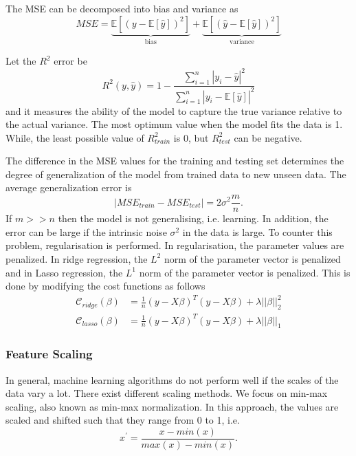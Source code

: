 The MSE can be decomposed into bias and variance as 
\begin{equation}
    MSE = \underbrace{\mathbb{E}[(y - \mathbb{E}[\hat{y}])^2]}_{\text{bias}} + \underbrace{\mathbb{E}[(\hat{y} - \mathbb{E}[\hat{y}])^2]}_{\text{variance}}
\end{equation}

Let the $R^2$ error be 
\begin{equation}
    R^2(y, \hat{y}) = 1 - \frac{\sum_{i=1}^{n}|y_i-\hat{y}|^2}{\sum_{i=1}^{n}|y_i-\mathbb{E}[\hat{y}]|^2}
\end{equation} and it measures the ability of the model to capture the true variance relative to the actual variance. The most optimum value when the model fits the data is 1. While, the least possible value of $R^2_{train}$ is 0, but $R^2_{test}$ can be negative.  

The difference in the MSE values  for the training and testing set determines the degree of generalization of the model from trained data to new unseen data. The average generalization error is \cite{mehta2019high}
\begin{equation*}
    |MSE_{train} - MSE_{test}| = 2\sigma^2\frac{m}{n}.
\end{equation*}
If $m >> n$ then the model is not generalising, i.e. learning. In addition, the error can be large if the intrinsic noise $\sigma^2$ in the data is large. To counter this problem, regularisation is performed. In regularisation, the parameter values are penalized. In ridge regression, the $L^2$ norm of the parameter vector is penalized and in Lasso regression, the $L^1$ norm of the parameter vector is penalized. This is done by modifying the cost functions as follows
\begin{align}
    \mathcal{C}_{ridge}(\beta) &=  \frac{1}{n}( y -  {X\beta})^T( y -  {X\beta}) + \lambda||\beta||_2^2 \\
    \mathcal{C}_{lasso}(\beta) &=  \frac{1}{n}( y -  {X\beta})^T( y -  {X\beta}) + \lambda||\beta||_1
\end{align}

\subsubsection{Feature Scaling}\label{subsubsec:scaling}
In general, machine learning algorithms do not perform well if the scales of the data vary a lot. There exist different scaling methods. We focus on min-max scaling, also known as min-max normalization. In this approach, the values are scaled and shifted such that they range from 0 to 1, i.e. 
\begin{equation*}
    x^{'} = \frac{x - min(x)}{max(x) - min(x)}.
\end{equation*}

